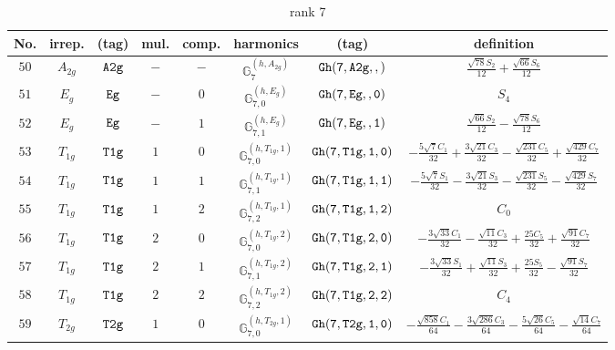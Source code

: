 \documentclass[fleqn,8pt]{jsarticle}
\begin{document}
\begin{table}[ht!]
\begin{center}
\caption{rank 7}
\renewcommand{\arraystretch}{1.3}
\begin{tabular}{cccccccc} \hline \hline
No. & irrep. & (tag) & mul. & comp. & harmonics & (tag) & definition \\ \hline
$ 50 $ & $ A_{2g} $ & $ {\tt A2g} $ & $ - $ & $ - $ & $ \mathbb{G}_{7}^{(h,A_{2g})} $ & $ {\tt Gh(7,A2g,,)} $ & $ \frac{\sqrt{78} S_{2}}{12} + \frac{\sqrt{66} S_{6}}{12} $ \\
$ 51 $ & $ E_{g} $ & $ {\tt Eg} $ & $ - $ & $ 0 $ & $ \mathbb{G}_{7,0}^{(h,E_{g})} $ & $ {\tt Gh(7,Eg,,0)} $ & $ S_{4} $ \\
$ 52 $ & $ E_{g} $ & $ {\tt Eg} $ & $ - $ & $ 1 $ & $ \mathbb{G}_{7,1}^{(h,E_{g})} $ & $ {\tt Gh(7,Eg,,1)} $ & $ \frac{\sqrt{66} S_{2}}{12} - \frac{\sqrt{78} S_{6}}{12} $ \\
$ 53 $ & $ T_{1g} $ & $ {\tt T1g} $ & $ 1 $ & $ 0 $ & $ \mathbb{G}_{7,0}^{(h,T_{1g},1)} $ & $ {\tt Gh(7,T1g,1,0)} $ & $ - \frac{5 \sqrt{7} C_{1}}{32} + \frac{3 \sqrt{21} C_{3}}{32} - \frac{\sqrt{231} C_{5}}{32} + \frac{\sqrt{429} C_{7}}{32} $ \\
$ 54 $ & $ T_{1g} $ & $ {\tt T1g} $ & $ 1 $ & $ 1 $ & $ \mathbb{G}_{7,1}^{(h,T_{1g},1)} $ & $ {\tt Gh(7,T1g,1,1)} $ & $ - \frac{5 \sqrt{7} S_{1}}{32} - \frac{3 \sqrt{21} S_{3}}{32} - \frac{\sqrt{231} S_{5}}{32} - \frac{\sqrt{429} S_{7}}{32} $ \\
$ 55 $ & $ T_{1g} $ & $ {\tt T1g} $ & $ 1 $ & $ 2 $ & $ \mathbb{G}_{7,2}^{(h,T_{1g},1)} $ & $ {\tt Gh(7,T1g,1,2)} $ & $ C_{0} $ \\
$ 56 $ & $ T_{1g} $ & $ {\tt T1g} $ & $ 2 $ & $ 0 $ & $ \mathbb{G}_{7,0}^{(h,T_{1g},2)} $ & $ {\tt Gh(7,T1g,2,0)} $ & $ - \frac{3 \sqrt{33} C_{1}}{32} - \frac{\sqrt{11} C_{3}}{32} + \frac{25 C_{5}}{32} + \frac{\sqrt{91} C_{7}}{32} $ \\
$ 57 $ & $ T_{1g} $ & $ {\tt T1g} $ & $ 2 $ & $ 1 $ & $ \mathbb{G}_{7,1}^{(h,T_{1g},2)} $ & $ {\tt Gh(7,T1g,2,1)} $ & $ - \frac{3 \sqrt{33} S_{1}}{32} + \frac{\sqrt{11} S_{3}}{32} + \frac{25 S_{5}}{32} - \frac{\sqrt{91} S_{7}}{32} $ \\
$ 58 $ & $ T_{1g} $ & $ {\tt T1g} $ & $ 2 $ & $ 2 $ & $ \mathbb{G}_{7,2}^{(h,T_{1g},2)} $ & $ {\tt Gh(7,T1g,2,2)} $ & $ C_{4} $ \\
$ 59 $ & $ T_{2g} $ & $ {\tt T2g} $ & $ 1 $ & $ 0 $ & $ \mathbb{G}_{7,0}^{(h,T_{2g},1)} $ & $ {\tt Gh(7,T2g,1,0)} $ & $ - \frac{\sqrt{858} C_{1}}{64} - \frac{3 \sqrt{286} C_{3}}{64} - \frac{5 \sqrt{26} C_{5}}{64} - \frac{\sqrt{14} C_{7}}{64} $ \\

\end{tabular}
\end{center}
\end{table}
\end{document}
